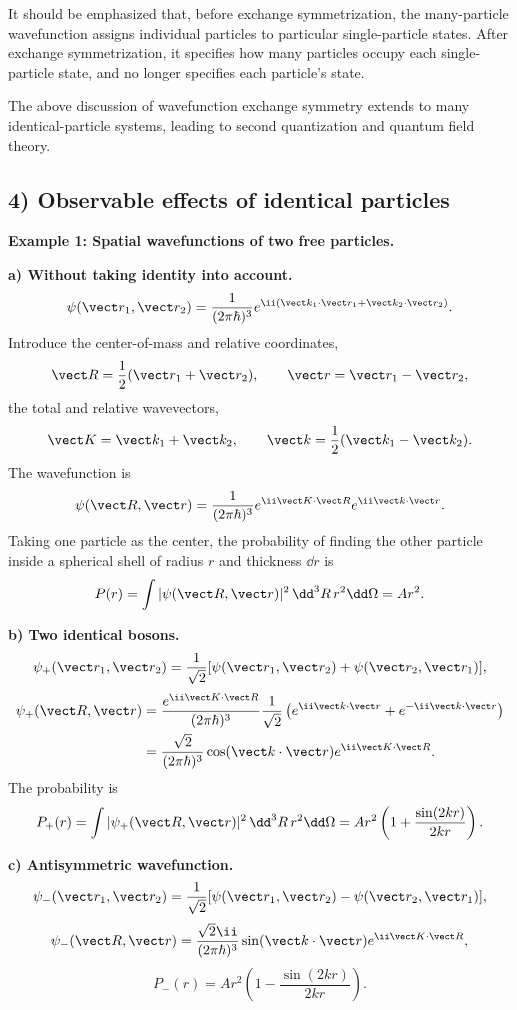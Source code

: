 It should be emphasized that, before exchange symmetrization, the many-particle wavefunction assigns individual particles to particular single-particle states. After exchange symmetrization, it specifies how many particles occupy each single-particle state, and no longer specifies each particle's state.

The above discussion of wavefunction exchange symmetry extends to many identical-particle systems, leading to second quantization and quantum field theory.

\subsection*{4) Observable effects of identical particles}
\textbf{Example 1: Spatial wavefunctions of two free particles.}

\textbf{a) Without taking identity into account.}
\[\psi(\vect r_1,\vect r_2)=\frac1{(2\pi\hbar)^3}
 e^{\ii(\vect k_1\cdot\vect r_1+\vect k_2\cdot\vect r_2)}.\]
Introduce the center-of-mass and relative coordinates,
\[\vect R=\frac12(\vect r_1+\vect r_2),\qquad
\vect r=\vect r_1-\vect r_2,\]
the total and relative wavevectors,
\[\vect K=\vect k_1+\vect k_2,\qquad
\vect k=\frac12(\vect k_1-\vect k_2).\]
The wavefunction is
\[\psi(\vect R,\vect r)=\frac1{(2\pi\hbar)^3}
 e^{\ii\vect K\cdot\vect R}e^{\ii\vect k\cdot\vect r}.\]
Taking one particle as the center, the probability of finding the other particle inside a spherical shell of radius $r$ and thickness $\dd r$ is
\[P(r)=\int|\psi(\vect R,\vect r)|^2\,\dd^3R\,r^2\dd\Omega
=Ar^2.\]

\textbf{b) Two identical bosons.}
\[\psi_+(\vect r_1,\vect r_2)=\frac1{\sqrt2}
[\psi(\vect r_1,\vect r_2)+\psi(\vect r_2,\vect r_1)],\]
\begin{align*}
\psi_+(\vect R,\vect r)
&=\frac{e^{\ii\vect K\cdot\vect R}}{(2\pi\hbar)^3}
\frac1{\sqrt2}\left(e^{\ii\vect k\cdot\vect r}+e^{-\ii\vect k\cdot\vect r}\right)\\
&=\frac{\sqrt2}{(2\pi\hbar)^3}
\cos(\vect k\cdot\vect r)e^{\ii\vect K\cdot\vect R}.
\end{align*}
The probability is
\[P_+(r)=\int|\psi_+(\vect R,\vect r)|^2\,
\dd^3R\,r^2\dd\Omega
=Ar^2\left(1+\frac{\sin(2kr)}{2kr}\right).\]

\textbf{c) Antisymmetric wavefunction.}
\[\psi_-(\vect r_1,\vect r_2)=\frac1{\sqrt2}
[\psi(\vect r_1,\vect r_2)-\psi(\vect r_2,\vect r_1)],\]
\[\psi_-(\vect R,\vect r)=\frac{\sqrt2\ii}{(2\pi\hbar)^3}
\sin(\vect k\cdot\vect r)e^{\ii\vect K\cdot\vect R},\]
\[P_-(r)=Ar^2\left(1-\frac{\sin(2kr)}{2kr}\right).\]

